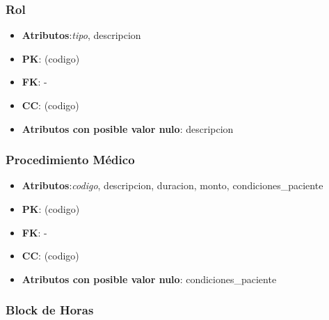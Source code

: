 \documentclass[a4paper,11pt]{article}
\begin{document}
\subsubsection{\textbf{Rol}}

\begin{itemize}

\item 
\textbf{Atributos}:\emph{tipo}, descripcion

\item 
\textbf{PK}: (codigo)

\item
\textbf{FK}: - 

\item 
\textbf{CC}: (codigo)

\item 
\textbf{Atributos con posible valor nulo}: descripcion

\end{itemize}

\subsubsection{\textbf{Procedimiento Médico}}

\begin{itemize}

\item 
\textbf{Atributos}:\emph{codigo}, descripcion, duracion, monto, condiciones\_paciente

\item 
\textbf{PK}: (codigo)

\item
\textbf{FK}: - 

\item 
\textbf{CC}: (codigo)

\item 
\textbf{Atributos con posible valor nulo}: condiciones\_paciente

\end{itemize}


\subsubsection{\textbf{Block de Horas}}
\end{document}
